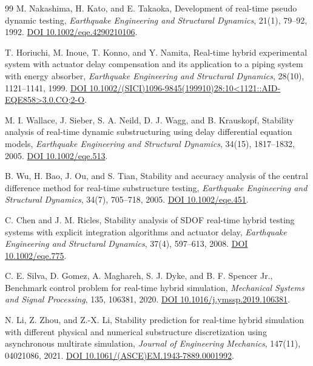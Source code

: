 \documentclass[11pt,a4paper]{article}
\begin{document}
\begin{thebibliography}{99}
M. Nakashima, H. Kato, and E. Takaoka, Development of real-time pseudo dynamic testing, \emph{Earthquake Engineering and Structural Dynamics}, 21(1), 79--92, 1992. \href{https://doi.org/10.1002/eqe.4290210106}{DOI 10.1002/eqe.4290210106}.

T. Horiuchi, M. Inoue, T. Konno, and Y. Namita, Real-time hybrid experimental system with actuator delay compensation and its application to a piping system with energy absorber, \emph{Earthquake Engineering and Structural Dynamics}, 28(10), 1121--1141, 1999. \href{https://doi.org/10.1002/(SICI)1096-9845(199910)28:10%3C1121::AID-EQE858%3E3.0.CO;2-O}{DOI 10.1002/(SICI)1096-9845(199910)28:10<1121::AID-EQE858>3.0.CO;2-O}.

M. I. Wallace, J. Sieber, S. A. Neild, D. J. Wagg, and B. Krauskopf, Stability analysis of real-time dynamic substructuring using delay differential equation models, \emph{Earthquake Engineering and Structural Dynamics}, 34(15), 1817--1832, 2005. \href{https://doi.org/10.1002/eqe.513}{DOI 10.1002/eqe.513}.

B. Wu, H. Bao, J. Ou, and S. Tian, Stability and accuracy analysis of the central difference method for real-time substructure testing, \emph{Earthquake Engineering and Structural Dynamics}, 34(7), 705--718, 2005. \href{https://doi.org/10.1002/eqe.451}{DOI 10.1002/eqe.451}.

C. Chen and J. M. Ricles, Stability analysis of SDOF real-time hybrid testing systems with explicit integration algorithms and actuator delay, \emph{Earthquake Engineering and Structural Dynamics}, 37(4), 597--613, 2008. \href{https://doi.org/10.1002/eqe.775}{DOI 10.1002/eqe.775}.

C. E. Silva, D. Gomez, A. Maghareh, S. J. Dyke, and B. F. Spencer Jr., Benchmark control problem for real-time hybrid simulation, \emph{Mechanical Systems and Signal Processing}, 135, 106381, 2020. \href{https://doi.org/10.1016/j.ymssp.2019.106381}{DOI 10.1016/j.ymssp.2019.106381}.

N. Li, Z. Zhou, and Z.-X. Li, Stability prediction for real-time hybrid simulation with different physical and numerical substructure discretization using asynchronous multirate simulation, \emph{Journal of Engineering Mechanics}, 147(11), 04021086, 2021. \href{https://doi.org/10.1061/(ASCE)EM.1943-7889.0001992}{DOI 10.1061/(ASCE)EM.1943-7889.0001992}.


\end{thebibliography}
\end{document}
